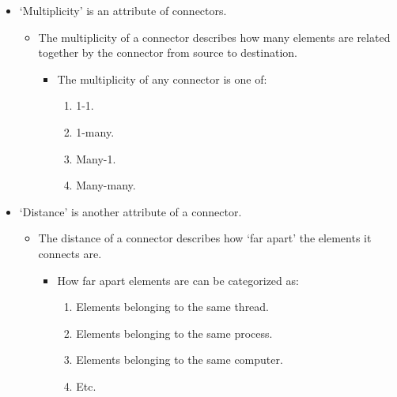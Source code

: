 \documentclass{article}
\begin{document}
\begin{itemize}
	\item `Multiplicity' is an attribute of connectors.
	\begin{itemize}
		\item The multiplicity of a connector describes how many elements are related together by the connector from source to destination.
		\begin{itemize}
			\item The multiplicity of any connector is one of:
			\begin{enumerate}
				\item 1-1.
				\item 1-many.
				\item Many-1.
				\item Many-many.
			\end{enumerate}
		\end{itemize}
	\end{itemize}
	\item `Distance' is another attribute of a connector.
	\begin{itemize}
		\item The distance of a connector describes how `far apart' the elements it connects are.
		\begin{itemize}
			\item How far apart elements are can be categorized as:
			\begin{enumerate}
				\item Elements belonging to the same thread.
				\item Elements belonging to the same process.
				\item Elements belonging to the same computer.
				\item Etc.
			\end{enumerate}
		\end{itemize}
	\end{itemize}
\end{itemize}

\ifdefined\iscombined
	\newpage
\else
	
\end{document}
